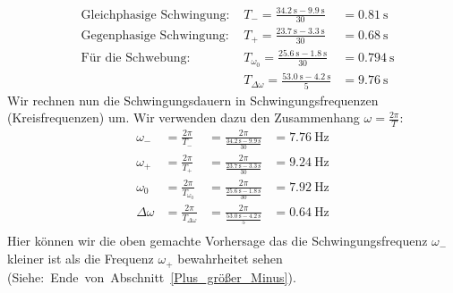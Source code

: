 \documentclass{article}
\begin{document}
                  \begin{equation}
                      \begin{aligned}
                           & \text{Gleichphasige Schwingung: } & T_{-} = \frac{ \SI{34.2}{\second} - \SI{9.9}{\second} }{30}            & = \SI{0.81}{\second}  \\ %
                           & \text{Gegenphasige Schwingung: }  & T_{+} = \frac{ \SI{23.7}{\second} - \SI{3.3}{\second} }{30}            & = \SI{0.68}{\second}  \\ %
                           & \text{Für die Schwebung: }        & T_{\omega_0} = \frac{ \SI{25.6}{\second} - \SI{1.8}{\second} }{30}     & = \SI{0.794}{\second} \\ %
                           &                                   & T_{\Delta \omega} = \frac{ \SI{53.0}{\second} - \SI{4.2}{\second} }{5} & = \SI{9.76}{\second}  %
                      \end{aligned}
                  \end{equation}
                  Wir rechnen nun die Schwingungsdauern in Schwingungsfrequenzen (Kreisfrequenzen) um.
                  Wir verwenden dazu den Zusammenhang \(\omega = \frac{2 \pi}{T}\):
                  \begin{equation}
                      \begin{aligned}
                          \omega_{-}    & = \frac{2 \pi}{T_{-}}             & = \frac{2 \pi}{\frac{ \SI{34.2}{\second} - \SI{9.9}{\second} }{30}}   & = \SI{7.76}{\hertz} \\ %
                          \omega_{+}    & = \frac{2 \pi}{T_{+}}             & = \frac{2 \pi}{\frac{ \SI{23.7}{\second} - \SI{3.3}{\second} }{30}}   & = \SI{9.24}{\hertz} \\ %
                          \omega_{0}    & = \frac{2 \pi}{T_{\omega_0}}      & = \frac{2 \pi}{ \frac{ \SI{25.6}{\second} - \SI{1.8}{\second} }{30} } & = \SI{7.92}{\hertz} \\ %
                          \Delta \omega & = \frac{2 \pi}{T_{\Delta \omega}} & = \frac{2 \pi}{ \frac{ \SI{53.0}{\second} - \SI{4.2}{\second} }{5} }  & = \SI{0.64}{\hertz} \\ %
                      \end{aligned}
                  \end{equation}
                  Hier können wir die oben gemachte Vorhersage das die Schwingungsfrequenz \(\omega_{-}\) kleiner ist als die Frequenz \(\omega_{+}\) bewahrheitet sehen (Siehe:~Ende~von~Abschnitt~\ref{Plus_größer_Minus}).
\end{document}
